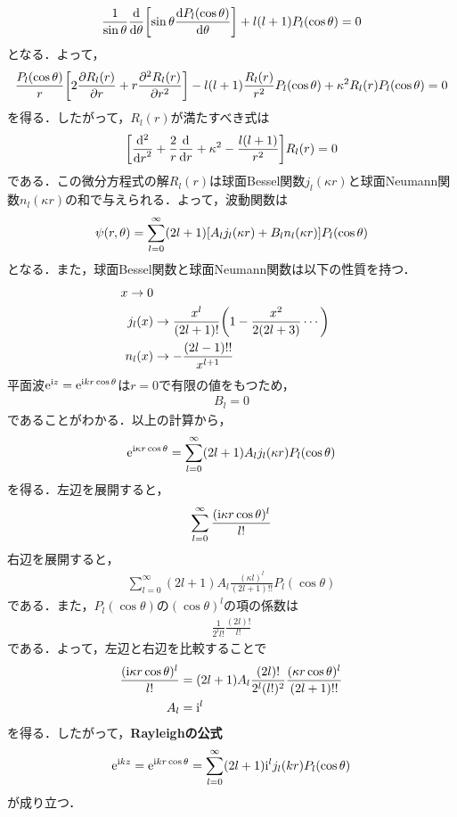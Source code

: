 \documentclass{report}
\begin{document}
  \begin{align}
    \frac{1}{\sin\theta}\frac{\mathrm{d}}{\dd{\theta}}\qty[\sin\theta\frac{\mathrm{d}P_l(\cos\theta)}{\dd{\theta}}] + l(l+1)P_l(\cos\theta) = 0
  \end{align}
  となる．よって，
  \begin{align}
    \frac{P_l(\cos\theta)}{r}\qty[2\frac{\partial R_l(r)}{\partial r} + r \frac{\partial^2 R_l(r)}{\partial r^2}]
    - l(l+1)\frac{R_l(r)}{r^2}P_l(\cos\theta)  + \kappa^2 R_l(r)P_l(\cos\theta) = 0
  \end{align}
  を得る．したがって，$R_l(r)$が満たすべき式は
  \begin{align}
    \qty[\frac{\mathrm{d}^2}{\dd{r}^2} + \frac{2}{r} \dv{}{r} + \kappa^2 - \frac{l(l+1)}{r^2}]R_l(r) = 0
  \end{align}
  である．この微分方程式の解$R_l(r)$は球面Bessel関数$j_l(\kappa r)$と球面Neumann関数$n_l(\kappa r)$の和で与えられる．よって，波動関数は
  \begin{align}
    \psi(r,\theta) = \sum_{l=0}^{\infty} (2l+1)\qty[A_l j_l(\kappa r) + B_l n_l(\kappa r)] P_l(\cos\theta)
  \end{align} 
  となる．また，球面Bessel関数と球面Neumann関数は以下の性質を持つ．
  \begin{align}
    x \to 0\\
    j_l(x) &\to \frac{x^l}{(2l+1)!}\qty(1 - \frac{x^2}{2(2l+3)}\cdots)\\
    n_l(x) &\to -\frac{(2l -1)!!}{x^{l+1}}
  \end{align}
  平面波$\mathrm{e}^{\mathrm{i}  z} = \mathrm{e}^{\mathrm{i} kr\cos\theta}$は$r=0$で有限の値をもつため，
  \begin{align}
    B_l =0
  \end{align} 
  であることがわかる．以上の計算から，
  \begin{align}
    \mathrm{e}^{\mathrm{i} \kappa r\cos\theta} = \sum_{l=0}^{\infty} (2l+1)A_l j_l(\kappa r) P_l(\cos\theta)
  \end{align}
  を得る．左辺を展開すると，
  \begin{align}
    \sum_{l=0}^{\infty}\frac{(\mathrm{i} \kappa r \cos\theta)^l}{l!}
  \end{align}
  右辺を展開すると，
  \begin{align}
    \sum_{l=0}^{\infty} (2l+1)A_l\frac{(\kappa l)^l}{(2l+1)!!}P_l(\cos\theta)
  \end{align}
  である．また，$P_l(\cos\theta)$の$(\cos\theta)^l$の項の係数は
  \begin{align}
    \frac{1}{2^l l!}\frac{(2l)!}{l!}
  \end{align}
  である．よって，左辺と右辺を比較することで
  \begin{align}
    \frac{(\mathrm{i} \kappa r \cos\theta)^l}{l!} &= (2l+1)A_l \frac{(2l)!}{2^l (l!)^2}\frac{(\kappa r \cos\theta)^l}{(2l+1)!!}\\
    A_l &= \mathrm{i}^l
  \end{align}
  を得る．したがって，\textbf{Rayleighの公式}
  \begin{align}
    \mathrm{e}^{\mathrm{i} kz} = \mathrm{e}^{\mathrm{i} kr\cos\theta} = \sum_{l=0}^{\infty} (2l+1)\mathrm{i}^l j_l(kr)P_l(\cos\theta)
  \end{align}
  が成り立つ．
\end{document}
